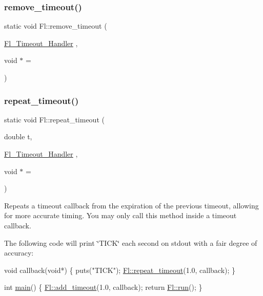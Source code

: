 \mbox{\label{class_fl_ad22be36baba9f4f3396aeed4c91fb257}} 
\subsubsection{\texorpdfstring{remove\+\_\+timeout()}{remove\_timeout()}}
{\footnotesize\ttfamily static void Fl\+::remove\+\_\+timeout (\begin{DoxyParamCaption}\item[{\hyperlink{group__callback__functions_ga17b5c6570394124287997166a50ff07a}{Fl\+\_\+\+Timeout\+\_\+\+Handler}}]{,  }\item[{void $\ast$}]{ = {} }\end{DoxyParamCaption})\hspace{0.3cm}{\ttfamily [static]}}

\mbox{\label{class_fl_af37afc5d555c5b213023d7a26cae1706}} 
\subsubsection{\texorpdfstring{repeat\+\_\+timeout()}{repeat\_timeout()}}
{\footnotesize\ttfamily static void Fl\+::repeat\+\_\+timeout (\begin{DoxyParamCaption}\item[{double}]{t,  }\item[{\hyperlink{group__callback__functions_ga17b5c6570394124287997166a50ff07a}{Fl\+\_\+\+Timeout\+\_\+\+Handler}}]{,  }\item[{void $\ast$}]{ = {} }\end{DoxyParamCaption})\hspace{0.3cm}{\ttfamily [static]}}

Repeats a timeout callback from the expiration of the previous timeout, allowing for more accurate timing. You may only call this method inside a timeout callback.

The following code will print \char`\"{}\+T\+I\+C\+K\char`\"{} each second on stdout with a fair degree of accuracy\+:


\begin{DoxyCode}
\textcolor{keywordtype}{void} callback(\textcolor{keywordtype}{void}*) \{
  puts(\textcolor{stringliteral}{"TICK"});
  \hyperlink{class_fl_af37afc5d555c5b213023d7a26cae1706}{Fl::repeat\_timeout}(1.0, callback);
\}

\textcolor{keywordtype}{int} \hyperlink{main_8cpp_ae66f6b31b5ad750f1fe042a706a4e3d4}{main}() \{
  \hyperlink{class_fl_a6a7f66c2bb04c04cb5252c0466f87022}{Fl::add\_timeout}(1.0, callback);
  \textcolor{keywordflow}{return} \hyperlink{class_fl_aaa544fdb18c1f31c96225f379335e72f}{Fl::run}();
\}
\end{DoxyCode}
 \mbox{\label{class_fl_aaa544fdb18c1f31c96225f379335e72f}} 
